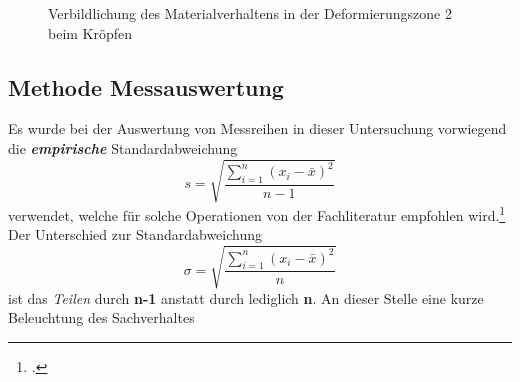 \documentclass[12pt,a4paper,parskip]{scrartcl}
\begin{document}
\begin{figure}[hbtp]
\centering
\hfill
{}
\hfill
{}
\hfill
\caption[Materialfluss Kröpfen]{ Verbildlichung des Materialverhaltens in der Deformierungszone 2 beim Kröpfen }
\label{fig:git}
\end{figure}











  











\subsection{Methode Messauswertung}
Es wurde bei der Auswertung von Messreihen in dieser Untersuchung vorwiegend die \textbf{\emph{empirische}} Standardabweichung 
\begin{equation}s= \sqrt{\frac{\sum \limits_{i=1}^n (x_i - \bar{x})^2}{n-1}}\end{equation}  verwendet, welche für solche Operationen von der Fachliteratur empfohlen wird.\footcite[Vgl.][301]{mf} Der Unterschied zur Standardabweichung \begin{equation} \sigma = \sqrt{\frac{\sum \limits_{i=1}^n (x_i - \bar{x})^2}{n}}\end{equation}  ist das \emph{Teilen} durch \textbf{n-1} anstatt durch lediglich \textbf{n}.
 An dieser Stelle eine kurze Beleuchtung des Sachverhaltes
\end{document}
